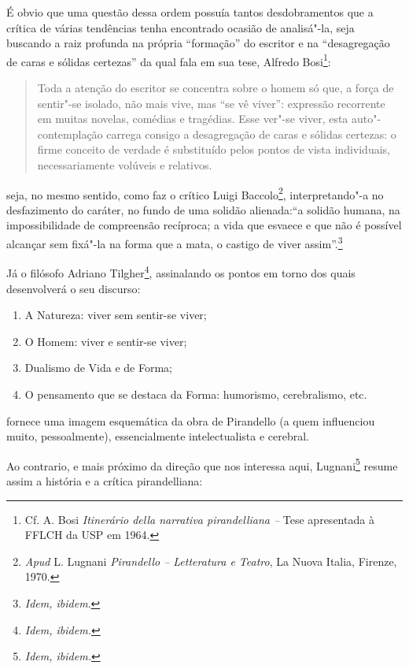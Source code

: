 É obvio que uma questão dessa ordem possuía tantos desdobramentos que a
crítica de várias tendências tenha encontrado ocasião de analisá"-la,
seja buscando a raiz profunda na própria ``formação'' do escritor e na
``desagregação de caras e sólidas certezas'' da qual fala em sua tese,
Alfredo Bosi\footnote{Cf. A. Bosi \emph{Itinerário della narrativa
  pirandelliana --} Tese apresentada à FFLCH da USP em 1964.}:

\begin{quote}
Toda a atenção do escritor se concentra sobre o homem só que, a
força de sentir"-se isolado, não mais vive, mas ``se vê viver'':
expressão recorrente em muitas novelas, comédias e tragédias. Esse
ver"-se viver, esta auto"-contemplação carrega consigo a desagregação de
caras e sólidas certezas: o firme conceito de verdade é substituído
pelos pontos de vista individuais, necessariamente volúveis e
relativos.
\end{quote}

seja, no mesmo sentido, como faz o crítico Luigi Baccolo\footnote{\emph{Apud}
  L. Lugnani \emph{Pirandello -- Letteratura e Teatro}, La Nuova Italia,
  Firenze, 1970.},
interpretando"-a no desfazimento do caráter, no fundo de uma solidão
alienada:``a solidão humana, na impossibilidade de compreensão recíproca; a
vida que esvaece e que não é possível alcançar sem fixá"-la na forma que
a mata, o castigo de viver assim''.\footnote{\emph{Idem,
  ibidem}.}

Já o filósofo Adriano Tilgher\footnote{\emph{Idem, ibidem.}}, assinalando os pontos em torno dos
quais desenvolverá o seu discurso:

\begin{enumerate}
\def\labelenumi{\arabic{enumi}.}
\item
  A Natureza: viver sem sentir-se viver;
\item
  O Homem: viver e sentir-se viver;
\item
  Dualismo de Vida e de Forma;
\item
  O pensamento que se destaca da Forma: humorismo, cerebralismo, etc.
\end{enumerate}

fornece uma imagem esquemática da obra de Pirandello (a quem
influenciou muito, pessoalmente), essencialmente intelectualista e
cerebral.

Ao contrario, e mais próximo da direção que nos interessa aqui, Lugnani\footnote{\emph{Idem, ibidem. }} resume assim a história e a crítica pirandelliana:

